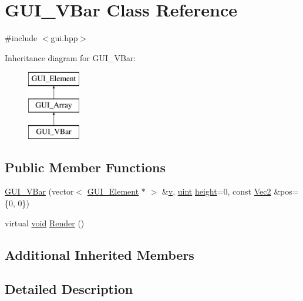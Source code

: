 \hypertarget{class_g_u_i___v_bar}{\section{G\-U\-I\-\_\-\-V\-Bar Class Reference}
\label{class_g_u_i___v_bar}
}


{\ttfamily \#include $<$gui.\-hpp$>$}

Inheritance diagram for G\-U\-I\-\_\-\-V\-Bar\-:\begin{figure}[H]
\begin{center}
\leavevmode
\includegraphics[height=3.000000cm]{class_g_u_i___v_bar}
\end{center}
\end{figure}
\subsection*{Public Member Functions}
\begin{DoxyCompactItemize}
\item 
\hyperlink{class_g_u_i___v_bar_a7c4384d997434d70d116e49ae2446b54}{G\-U\-I\-\_\-\-V\-Bar} (vector$<$ \hyperlink{class_g_u_i___element}{G\-U\-I\-\_\-\-Element} $\ast$ $>$ \&\hyperlink{_s_d_l__opengl_8h_a10a82eabcb59d2fcd74acee063775f90}{v}, \hyperlink{common_8hpp_a69aa29b598b851b0640aa225a9e5d61d}{uint} \hyperlink{_s_d_l__opengl_8h_aa352f2804b9902ac30769c00dde75d5f}{height}=0, const \hyperlink{class_vec2}{Vec2} \&pos=\{0, 0\})
\item 
virtual \hyperlink{_s_d_l__opengles2__gl2ext_8h_ae5d8fa23ad07c48bb609509eae494c95}{void} \hyperlink{class_g_u_i___v_bar_a89ef7a6c91df977a79d4ec9dbf37472e}{Render} ()
\end{DoxyCompactItemize}
\subsection*{Additional Inherited Members}


\subsection{Detailed Description}



